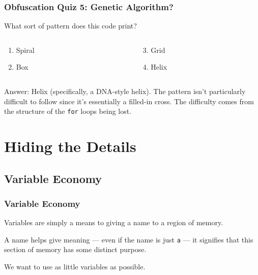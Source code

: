\documentclass[xcolor]{beamer}
\begin{document}
\begin{frame}
	\frametitle{Obfuscation Quiz 5: Genetic Algorithm?}
	\pause
	
	What sort of pattern does this code print?
	
	
	\pause
	
	\begin{columns}
		\begin{column}{0.45\textwidth}
			\begin{enumerate}
				\item Spiral
				\pause
				\item Box
			\end{enumerate}
		\end{column}
		\pause
		\begin{column}{0.45\textwidth}
			\begin{enumerate}
				\setcounter{enumi}{2}
				\item Grid
				\pause
				\item Helix
			\end{enumerate}
		\end{column}
	\end{columns}
	\pause
	
	\vspace{0.5cm}
	
	Answer: Helix (specifically, a DNA-style helix). \pause The pattern isn't particularly difficult to follow since it's essentially a filled-in cross. \pause The difficulty comes from the structure of the \texttt{for} loops being lost.
\end{frame}

\section{Hiding the Details}

\subsection{Variable Economy}

\begin{frame}
	\frametitle{Variable Economy}
	\pause
	
	Variables are simply a means to giving a name to a region of memory.
	\pause
	
	A name helps give meaning --- even if the name is just \texttt{a} --- it signifies that this section of memory has some distinct purpose.
	\pause
	
	We want to use as little variables as possible.
	\pause
	
	
\end{frame}
\end{document}
